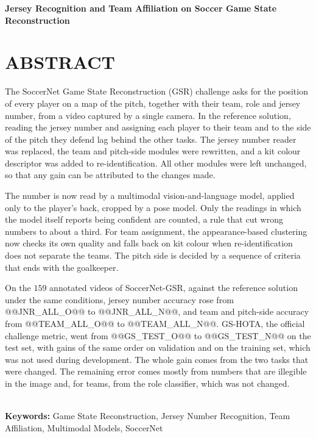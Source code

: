 \begingroup
\begin{flushleft}
\bfseries
{}
{\Large
Jersey Recognition and Team Affiliation on Soccer Game State Reconstruction}

\mdseries
\end{flushleft}
\normalsize
\let\clearpage\relax
\chapter{ABSTRACT}
\endgroup

\noindent The SoccerNet Game State Reconstruction (GSR) challenge asks for the position of every
player on a map of the pitch, together with their team, role and jersey number, from a video captured
by a single camera. In the reference solution, reading the jersey number and assigning each player to their team and
to the side of the pitch they defend lag behind the other tasks. The jersey number reader was replaced, the team and pitch-side modules
were rewritten, and a kit colour descriptor was added to re-identification. All other modules were left
unchanged, so that any gain can be attributed to the changes made.

The number is now read by a multimodal vision-and-language model, applied only to the player's back,
cropped by a pose model. Only the readings in which the model itself reports being
confident are counted, a rule that cut wrong numbers to about a third. For team assignment, the
appearance-based clustering now checks its own quality and falls back on kit colour when
re-identification does not separate the teams. The pitch side is decided by a sequence of criteria
that ends with the goalkeeper.

On the $159$ annotated videos of SoccerNet-GSR, against the reference solution under the same conditions, jersey number accuracy rose from @@JNR_ALL_O@@ to @@JNR_ALL_N@@, and team and pitch-side
accuracy from @@TEAM_ALL_O@@ to @@TEAM_ALL_N@@. GS-HOTA, the official challenge metric, went from
@@GS_TEST_O@@ to @@GS_TEST_N@@ on the test set, with gains of the same order on validation and on the
training set, which was not used during development. The whole gain comes from the two tasks that were
changed. The remaining error comes mostly from numbers that are illegible in the image and, for teams,
from the role classifier, which was not changed.

\hspace{3cm}\\
\indent
\textbf{Keywords: } Game State Reconstruction, Jersey Number Recognition, Team Affiliation,
Multimodal Models, SoccerNet
